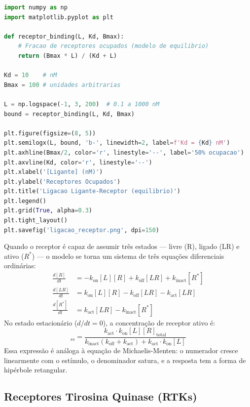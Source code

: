\begin{lstlisting}[language=Python, caption=Curva de ligacao ligante-receptor]
import numpy as np
import matplotlib.pyplot as plt

def receptor_binding(L, Kd, Bmax):
    # Fracao de receptores ocupados (modelo de equilibrio)
    return (Bmax * L) / (Kd + L)

Kd = 10    # nM
Bmax = 100 # unidades arbitrarias

L = np.logspace(-1, 3, 200)  # 0.1 a 1000 nM
bound = receptor_binding(L, Kd, Bmax)

plt.figure(figsize=(8, 5))
plt.semilogx(L, bound, 'b-', linewidth=2, label=f'Kd = {Kd} nM')
plt.axhline(Bmax/2, color='r', linestyle='--', label='50% ocupacao')
plt.axvline(Kd, color='r', linestyle='--')
plt.xlabel('[Ligante] (nM)')
plt.ylabel('Receptores Ocupados')
plt.title('Ligacao Ligante-Receptor (equilibrio)')
plt.legend()
plt.grid(True, alpha=0.3)
plt.tight_layout()
plt.savefig('ligacao_receptor.png', dpi=150)
\end{lstlisting}

Quando o receptor é capaz de assumir três estados --- livre (R), ligado (LR) e
ativo ($R^*$) --- o modelo se torna um sistema de três equações diferenciais
ordinárias:
\begin{align}
\frac{d[R]}{dt} &= -k_{\mathrm{on}}[L][R] + k_{\mathrm{off}}[LR]
                   + k_{\mathrm{inact}}[R^*] \\
\frac{d[LR]}{dt} &= k_{\mathrm{on}}[L][R] - k_{\mathrm{off}}[LR]
                    - k_{\mathrm{act}}[LR] \\
\frac{d[R^*]}{dt} &= k_{\mathrm{act}}[LR] - k_{\mathrm{inact}}[R^*]
\end{align}
No estado estacionário ($d/dt = 0$), a concentração de receptor ativo é:
\begin{equation}
[R^*]_{ss} = \frac{k_{\mathrm{act}} \cdot k_{\mathrm{on}}[L][R]_{\mathrm{total}}}
{k_{\mathrm{inact}}(k_{\mathrm{off}} + k_{\mathrm{act}})
 + k_{\mathrm{act}} \cdot k_{\mathrm{on}}[L]}
\end{equation}
Essa expressão é análoga à equação de Michaelis-Menten: o numerador cresce
linearmente com o estímulo, o denominador satura, e a resposta tem a forma de
hipérbole retangular.


\subsection{Receptores Tirosina Quinase (RTKs)}
\label{subsec:09-rtk}

